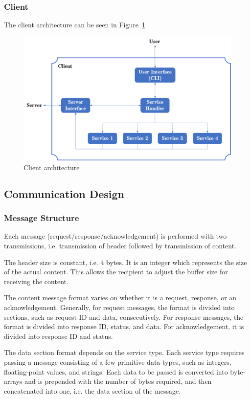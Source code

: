 \documentclass[12pt]{article}
\begin{document}
\subsubsection{Client}
The client architecture can be seen in Figure~\ref{fig:client-architecture}
\begin{figure}[htbp!]
    \centering
    \includegraphics[width=1.0\textwidth]{client.png}
    \caption[Client Architecture]{Client architecture}
    \label{fig:client-architecture}
\end{figure}

\subsection{Communication Design}

\subsubsection{Message Structure}
Each message (request/response/acknowledgement) is performed with two transmissions, i.e. transmission of header followed by transmission of content.

The header size is constant, i.e. 4 bytes. It is an integer which represents the size of the actual content. This allows the recipient to adjust the buffer size for receiving the content.

The content message format varies on whether it is a request, response, or an acknowledgement. Generally, for request messages, the format is divided into sections, such as request ID and data, consecutively. For response messages, the format is divided into response ID, status, and data. For acknowledgement, it is divided into response ID and status.

The data section format depends on the service type. Each service type requires passing a message consisting of a few primitive data-types, such as integers, floating-point values, and strings. Each data to be passed is converted into byte-arrays and is prepended with the number of bytes required, and then concatenated into one, i.e. the data section of the message.
\end{document}
